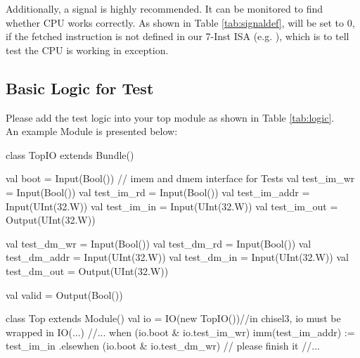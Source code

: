 \documentclass[a4paper]{article}
\begin{document}
Additionally, a  signal is highly recommended. It can be monitored to find whether CPU works correctly. As shown in Table \ref{tab:signaldef},  will be set to 0, if the fetched instruction is not defined in our 7-Inst ISA (e.g. ), which is to tell test the CPU is working in exception.

\subsection{Basic Logic for Test}\label{sub:testlogic}
Please add the test logic into your top module as shown in Table \ref{tab:logic}.\\
An example  Module is presented below:
\begin{scala}
class TopIO extends Bundle() {
	val boot = Input(Bool()) 
// imem and dmem interface for Tests
	val test_im_wr		= Input(Bool())
	val test_im_rd 		= Input(Bool())
	val test_im_addr 	= Input(UInt(32.W))
	val test_im_in 		= Input(UInt(32.W))
	val test_im_out 	= Output(UInt(32.W))

	val test_dm_wr		= Input(Bool())
	val test_dm_rd 		= Input(Bool())
	val test_dm_addr 	= Input(UInt(32.W))
	val test_dm_in 		= Input(UInt(32.W))
	val test_dm_out 	= Output(UInt(32.W))

	val valid			= Output(Bool())
}
class Top extends Module() {
	val io 		= IO(new TopIO())//in chisel3, io must be wrapped in IO(...) 
	//...
	when (io.boot & io.test_im_wr){
		imm(test_im_addr) := test_im_in
		} .elsewhen (io.boot & io.test_dm_wr){
		// please finish it
		} //...
}
\end{scala}
\end{document}
